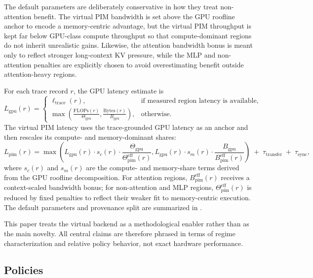 The default parameters are deliberately conservative in how they treat non-attention benefit. The virtual PIM bandwidth is set above the GPU roofline anchor to encode a memory-centric advantage, but the virtual PIM throughput is kept far below GPU-class compute throughput so that compute-dominant regions do not inherit unrealistic gains. Likewise, the attention bandwidth bonus is meant only to reflect stronger long-context KV pressure, while the MLP and non-attention penalties are explicitly chosen to avoid overestimating benefit outside attention-heavy regions.

For each trace record $r$, the GPU latency estimate is
\[
L_{\mathrm{gpu}}(r)=
\begin{cases}
\ell_{\mathrm{trace}}(r), & \text{if measured region latency is available}, \\
\max\!\left(\frac{\mathrm{FLOPs}(r)}{\Theta_{\mathrm{gpu}}}, \frac{\mathrm{Bytes}(r)}{B_{\mathrm{gpu}}}\right), & \text{otherwise}.
\end{cases}
\]
The virtual PIM latency uses the trace-grounded GPU latency as an anchor and then rescales its compute- and memory-dominant shares:
\[
L_{\mathrm{pim}}(r)=
\max\!\left(
L_{\mathrm{gpu}}(r)\cdot s_c(r)\cdot \frac{\Theta_{\mathrm{gpu}}}{\Theta_{\mathrm{pim}}^{\mathrm{eff}}(r)},
L_{\mathrm{gpu}}(r)\cdot s_m(r)\cdot \frac{B_{\mathrm{gpu}}}{B_{\mathrm{pim}}^{\mathrm{eff}}(r)}
\right)
\;+\;
\tau_{\mathrm{transfer}}
\;+\;
\tau_{\mathrm{sync}},
\]
where $s_c(r)$ and $s_m(r)$ are the compute- and memory-share terms derived from the GPU roofline decomposition. For attention regions, $B_{\mathrm{pim}}^{\mathrm{eff}}(r)$ receives a context-scaled bandwidth bonus; for non-attention and MLP regions, $\Theta_{\mathrm{pim}}^{\mathrm{eff}}(r)$ is reduced by fixed penalties to reflect their weaker fit to memory-centric execution. The default parameters and provenance split are summarized in .




This paper treats the virtual backend as a methodological enabler rather than as the main novelty. All central claims are therefore phrased in terms of regime characterization and relative policy behavior, not exact hardware performance.

\subsection{Policies}

